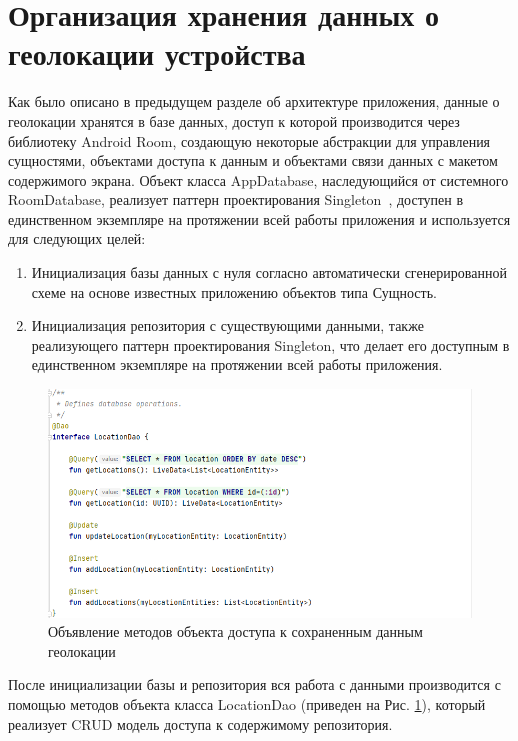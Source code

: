 \section{Организация хранения данных о геолокации устройства}
Как было описано в предыдущем разделе об архитектуре приложения, данные о геолокации хранятся в базе данных, доступ к которой производится через библиотеку Android Room, создающую некоторые абстракции для управления сущностями, объектами доступа к данным и объектами связи данных с макетом содержимого экрана.
Объект класса AppDatabase, наследующийся от системного RoomDatabase, реализует паттерн проектирования Singleton~\autocite{singleton}, доступен в единственном экземпляре на протяжении всей работы приложения и используется для следующих целей:
\begin{enumerate}
	\item Инициализация базы данных с нуля согласно автоматически сгенерированной схеме на основе известных приложению объектов типа Сущность.
	\item Инициализация репозитория с существующими данными, также реализующего паттерн проектирования Singleton, что делает его доступным в единственном экземпляре на протяжении всей работы приложения.
\end{enumerate}


\begin{figure}
	\centering
	\includegraphics[width=\textwidth]{flesh/somefunc/location_dao.png}
	\caption{\label{fig:location_dao}Объявление методов объекта доступа к сохраненным данным геолокации}
\end{figure}

После инициализации базы и репозитория вся работа с данными производится с помощью методов объекта класса LocationDao (приведен на Рис. \ref{fig:location_dao}), который реализует CRUD модель доступа к содержимому репозитория.

